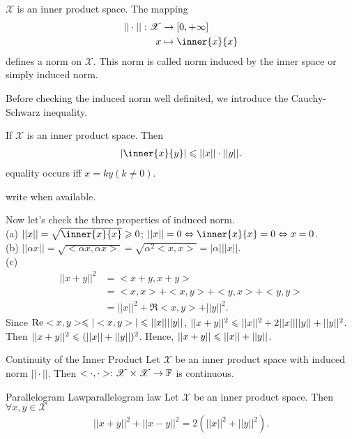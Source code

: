 \begin{definition}{}{}
    $\mathscr{X}$ is an inner product space.
    The mapping
    \begin{align*}
        ||\cdot||: \mathscr{X}&\rightarrow [0,+\infty]\\
        x &\mapsto \inner{x}{x}
    \end{align*} 
    defines a norm on $\mathscr{X}$. This norm is called norm induced by the inner space or simply induced norm.
\end{definition}

Before checking the induced norm well definited, we introduce the Cauchy-Schwarz inequality.

\begin{theorem}{}{}
    If $\mathscr{X}$ is an inner product space. Then
    \begin{align*}
        |\inner{x}{y}|\leqs ||x||\cdot ||y||.
    \end{align*}
    equality occurs iff $x=ky(k\neq 0)$.
\end{theorem}
\begin{proofsolution}
    write when available.
\end{proofsolution}

Now let's check the three properties of induced norm.\\
(a) $||x|| = \sqrt{\inner{x}{x}}\geqs 0$; $||x||=0\Leftrightarrow \inner{x}{x}=0\Leftrightarrow x=0$.\\
(b) $||\alpha x|| = \sqrt{<\alpha x,\alpha x>} = \sqrt{\alpha^2<x,x>}= |\alpha| ||x||$.\\
(c) \begin{align*}
    ||x+y||^2 &= <x+y,x+y> \\
    &= <x,x>+<x,y>+<y,x>+<y,y> \\
    &= ||x||^2 + \Re<x,y> + ||y||^2.
\end{align*}
    Since $\Re<x,y>\leqslant |<x,y>|\leqslant ||x||||y||$, $||x+y||^2\leqslant ||x||^2 + 2||x||||y||+||y||^2$. Then $||x+y||^2\leqslant (||x||+||y||)^2$. Hence, $||x+y||\leqslant ||x||+||y||$.

    

\begin{proposition}{Continuity of the Inner Product}{}
    Let $\mathscr{X}$ be an inner product space with induced norm $||\cdot||$. 
    Then $<\cdot,\cdot>:\mathscr{X}\times\mathscr{X}\rightarrow \mathbb{F}$ is continuous.  
\end{proposition}


\begin{proposition}{Parallelogram Law}{parallelogram law}
    Let $\mathscr{X}$ be an inner product space. Then $\forall x,y\in \mathscr{X}$
    \begin{align*}
        ||x+y||^2+||x-y||^2 = 2(||x||^2+||y||^2).
    \end{align*}
\end{proposition}

